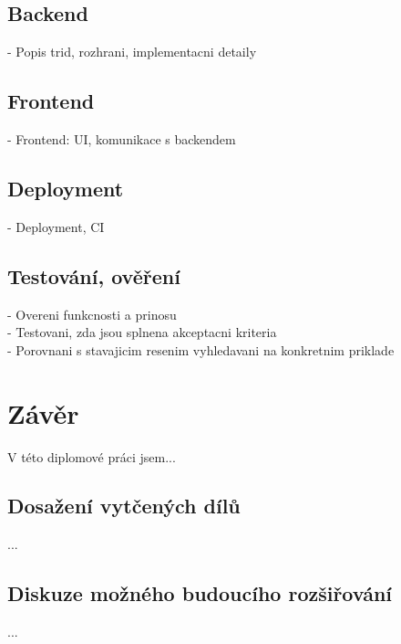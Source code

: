 \documentclass[FM,DP]{tulthesis}
\begin{document}
\section{Backend}
- Popis trid, rozhrani, implementacni detaily

\section{Frontend}
- Frontend: UI, komunikace s backendem

\section{Deployment}
- Deployment, CI

\section{Testování, ověření}
- Overeni funkcnosti a prinosu\\
- Testovani, zda jsou splnena akceptacni kriteria\\
- Porovnani s stavajicim resenim vyhledavani na konkretnim priklade


\chapter{Závěr}
V této diplomové práci jsem...

\section{Dosažení vytčených dílů}
...

\section{Diskuze možného budoucího rozšiřování}
...
\end{document}
